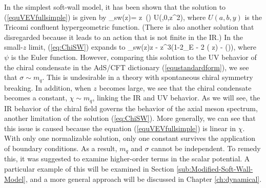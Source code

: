 In the simplest soft-wall model, it has been shown \cite{FILL-IN} that the solution to (\ref{equVEVfullsimple}) is given by 
\be
\chi_{sw}(z)=  z \,\Gamma\left(\right) U\left(,0,\lambda z^{2}\right),
\label{eq:ChiSW}
\ee
where $U(a,b,y)$ is the Tricomi confluent hypergeometric function. 
(There is also another solution that disregarded because it leads to an action that is not finite in the IR.)
In the small-$z$ limit, (\ref{eq:ChiSW}) expands to \cite{Colangelo:2008us}
\be
\label{equvevswsolexp}
\chi_{sw}(z)\rightarrow {}z - z^{3}\left(1-2\gamma_{E} - 2 \log(\sqrt{\lambda} z) - \psi\left(\right)\right),
\ee
where $\psi$ is the Euler function.
However, comparing this solution to the UV behavior of the chiral condensate in the AdS/CFT dictionary (\ref{equstandardform}), we see that $\sigma \sim m_q$.
This is undesirable in a theory with spontaneous chiral symmetry breaking.
In addition, when $z$ becomes large, we see that the chiral condensate becomes a constant, $\chi \sim m_q$, linking the IR and UV behavior. 
As we will see, the IR behavior of the chiral field governs the behavior of the axial meson spectrum, another limitation of the solution (\ref{eq:ChiSW}).
More generally, we can see that this issue is caused because the equation (\ref{equVEVfullsimple}) is linear in $\chi$.
With only one normalizable solution, only one constant survives the application of boundary conditions.
As a result, $m_q$ and $\sigma$ cannot be independent.
To remedy this, it was suggested \cite{Karch} to examine higher-order terms in the scalar potential. 
A particular example of this will be examined in Section \ref{sub:Modified-Soft-Wall-Model}, and a more general approach will be discussed in Chapter \ref{ch:dynamical}.

